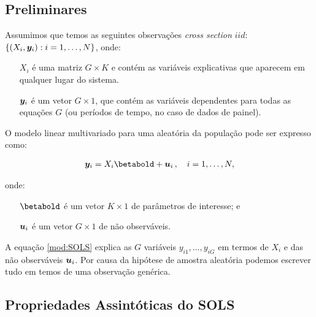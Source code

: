 \documentclass[11pt, oneside, a4paper, article]{article}
\numberwithin{equation}{section}
\begin{document}
\citet[Sec.7.3 -- System OLS Estimation of a Multivariate Linear System, p.147]{wool-2010} 

\subsection{Preliminares}
\noindent
\citet[Sec.7.3.1]{wool-2010}

Assumimos que temos as seguintes observações \textit{cross section} $iid$:
$\{ (X_{i}, \boldsymbol{y}_{i}): i=1, \dots, N\}$, onde:

\vspace{-1 ex}
\begin{itemize}[itemsep = -1ex]
\item [$X_{i}$]  é uma matriz $G \times K$ e contém as variáveis explicativas que aparecem em qualquer lugar do sistema.
\item [$\boldsymbol{y}_{i}$]  é um vetor $G \times 1$, que contém as variáveis dependentes para todas as equações $G$ (ou períodos de tempo, no caso de dados de painel).
\end{itemize}

O modelo linear multivariado para uma  aleatória da população pode ser expresso como:

\vspace{-1 em}
\begin{align}\label{mod:SOLS}
	\mbs{y}_{i} = X_{i} \betabold + \mbs{u}_{i} \, , \quad i=1, \dots, N,
\end{align}

\noindent
onde:

\vspace{-1 em}
\begin{itemize}[itemsep = -1ex]
\item [$\betabold$] é um vetor $K \times 1$ de parâmetros de interesse; e
\item [$\boldsymbol{u}_{i}$] é um vetor $G \times 1$ de não observáveis.
\end{itemize}

A equação \eqref{mod:SOLS} explica as $G$ variáveis $y_{i1}, \dots, y_{iG}$ em termos de $X_{i}$ e das não observáveis $\boldsymbol{u}_{i}$.
Por causa da hipótese de amostra aleatória podemos escrever tudo em temos de uma observação genérica.

\subsection{Propriedades Assintóticas do SOLS}
\noindent
\citet[Sec.7.3.1]{wool-2010}
\end{document}
